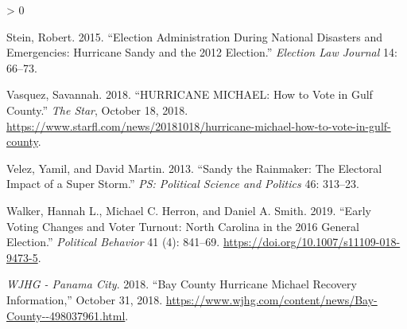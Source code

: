 \documentclass[
  12pt,
]{article}
\newlength{\cslhangindent}
\newenvironment{CSLReferences}[2] %
 {%
  \setlength{\parindent}{0pt}
  \ifodd #1 \everypar{\setlength{\hangindent}{\cslhangindent}}\ignorespaces\fi
  \ifnum #2 > 0
  \setlength{\parskip}{#2\baselineskip}
  \fi
 }%
 {}
\begin{document}
\begin{CSLReferences}{1}{0}
\leavevmode\hypertarget{ref-Stein2015}{}%
Stein, Robert. 2015. {``Election {Administration During National Disasters} and {Emergencies}: {Hurricane Sandy} and the 2012 {Election}.''} \emph{Election Law Journal} 14: 66--73.

\leavevmode\hypertarget{ref-Vasquez2018}{}%
Vasquez, Savannah. 2018. {``{HURRICANE MICHAEL}: {How} to Vote in {Gulf County}.''} \emph{The Star}, October 18, 2018. \url{https://www.starfl.com/news/20181018/hurricane-michael-how-to-vote-in-gulf-county}.

\leavevmode\hypertarget{ref-Velez2013}{}%
Velez, Yamil, and David Martin. 2013. {``Sandy the {Rainmaker}: {The Electoral Impact} of a {Super Storm}.''} \emph{PS: Political Science and Politics} 46: 313--23.

\leavevmode\hypertarget{ref-Walker2019}{}%
Walker, Hannah L., Michael C. Herron, and Daniel A. Smith. 2019. {``Early {Voting Changes} and {Voter Turnout}: {North Carolina} in the 2016 {General Election}.''} \emph{Political Behavior} 41 (4): 841--69. \url{https://doi.org/10.1007/s11109-018-9473-5}.

\leavevmode\hypertarget{ref-WJHG2018}{}%
\emph{WJHG - Panama City}. 2018. {``Bay {County Hurricane Michael Recovery Information},''} October 31, 2018. \url{https://www.wjhg.com/content/news/Bay-County--498037961.html}.

\end{CSLReferences}
\end{document}

